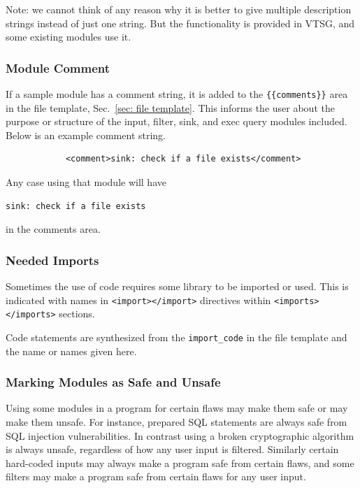 Note: we cannot think of any reason why it is better to give multiple description
strings instead of just one string.  But the functionality is provided in VTSG, and
some existing modules use it.


\subsubsection{Module Comment}
\label{sec:module comment}

If a sample module has a comment string, it is added to the
\verb|{{comments}}| area in the file template, Sec.~\ref{sec: file template}.
This informs the user about the purpose or structure of the input, filter, sink, and
exec query modules included.  Below is an example comment string.

\begin{verbatim}
            <comment>sink: check if a file exists</comment>
\end{verbatim}

Any case using that module will have
\begin{verbatim}
sink: check if a file exists
\end{verbatim}
in the comments area.


\subsubsection{Needed Imports}
\label{sec:module import}

Sometimes the use of code requires some library to be imported or used.  This is
indicated with names in \verb|<import></import>| directives within
\verb|<imports></imports>| sections.

Code statements are synthesized from the \verb|import_code| in the file template and
the name or names given here.


\subsubsection{Marking Modules as Safe and Unsafe}
\label{sec:safe or unsafe}

Using some modules in a program for certain flaws may make them safe or may make them
unsafe.  For instance, prepared SQL statements are always safe from SQL injection
vulnerabilities.  In contrast using a broken cryptographic algorithm is always
unsafe, regardless of how any user input is filtered.  Similarly certain
hard-coded inputs may always make a program safe from certain flaws, and some filters
may make a program safe from certain flaws for any user input.

